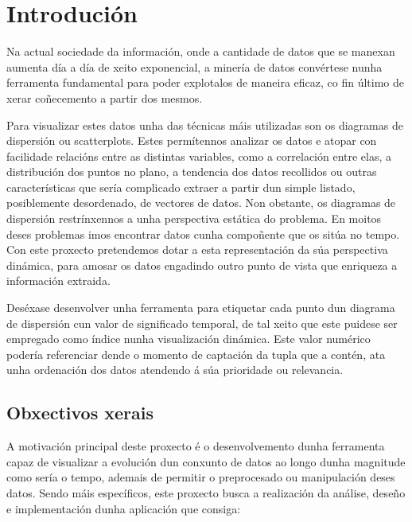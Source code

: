 \chapter{Introdución}

Na actual sociedade da información, onde a cantidade de datos que se manexan aumenta día a día de xeito exponencial, a minería de datos convértese nunha ferramenta fundamental para poder explotalos de maneira eficaz, co fin último de xerar coñecemento a partir dos mesmos.

Para visualizar estes datos unha das técnicas máis utilizadas son os diagramas de dispersión ou scatterplots. Estes permítennos analizar os datos e atopar con facilidade relacións entre as distintas variables, como a correlación entre elas, a distribución dos puntos no plano, a tendencia dos datos recollidos ou outras características que sería complicado extraer a partir dun simple listado, posiblemente desordenado, de vectores de datos. Non obstante, os diagramas de dispersión restrínxennos a unha perspectiva estática do problema. En moitos deses problemas imos encontrar datos cunha compoñente que os sitúa no tempo. Con este proxecto pretendemos dotar a esta representación da súa perspectiva dinámica, para amosar os datos engadindo outro punto de vista que enriqueza a información extraida.

Deséxase desenvolver unha ferramenta para etiquetar cada punto dun diagrama de dispersión cun valor de significado temporal, de tal xeito que este puidese ser empregado como índice nunha visualización dinámica. Este valor numérico podería referenciar dende o momento de captación da tupla que a contén, ata unha ordenación dos datos atendendo á súa prioridade ou relevancia.

\section{Obxectivos xerais}

A motivación principal deste proxecto é o desenvolvemento dunha ferramenta capaz de visualizar a evolución dun conxunto de datos ao longo dunha magnitude como sería o tempo, ademais de permitir o preprocesado ou manipulación deses datos. Sendo máis específicos, este proxecto busca a realización da análise, deseño e implementación dunha aplicación que consiga: 

